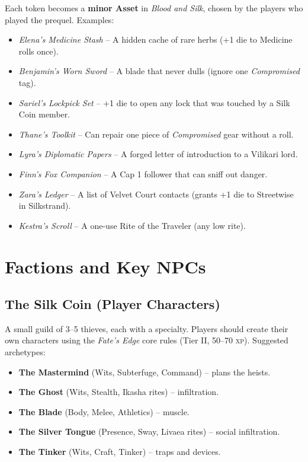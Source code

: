 \documentclass[10pt,twoside]{book}
\newcommand{\xp}{\textsc{xp}}
\begin{document}
Each token becomes a \textbf{minor Asset} in \textit{Blood and Silk}, chosen by the players who played the prequel. Examples:

\begin{itemize}
\item \textit{Elena's Medicine Stash} -- A hidden cache of rare herbs (+1 die to Medicine rolls once).
\item \textit{Benjamin's Worn Sword} -- A blade that never dulls (ignore one \textit{Compromised} tag).
\item \textit{Sariel's Lockpick Set} -- +1 die to open any lock that was touched by a Silk Coin member.
\item \textit{Thane's Toolkit} -- Can repair one piece of \textit{Compromised} gear without a roll.
\item \textit{Lyra's Diplomatic Papers} -- A forged letter of introduction to a Vilikari lord.
\item \textit{Finn's Fox Companion} -- A Cap 1 follower that can sniff out danger.
\item \textit{Zara's Ledger} -- A list of Velvet Court contacts (grants +1 die to Streetwise in Silkstrand).
\item \textit{Kestra's Scroll} -- A one-use Rite of the Traveler (any low rite).
\end{itemize}

\section{Factions and Key NPCs}

\subsection{The Silk Coin (Player Characters)}
A small guild of 3--5 thieves, each with a specialty. Players should create their own characters using the \textit{Fate's Edge} core rules (Tier II, 50--70 \xp). Suggested archetypes:

\begin{itemize}
\item \textbf{The Mastermind} (Wits, Subterfuge, Command) -- plans the heists.
\item \textbf{The Ghost} (Wits, Stealth, Ikasha rites) -- infiltration.
\item \textbf{The Blade} (Body, Melee, Athletics) -- muscle.
\item \textbf{The Silver Tongue} (Presence, Sway, Livaea rites) -- social infiltration.
\item \textbf{The Tinker} (Wits, Craft, Tinker) -- traps and devices.
\end{itemize}
\end{document}

